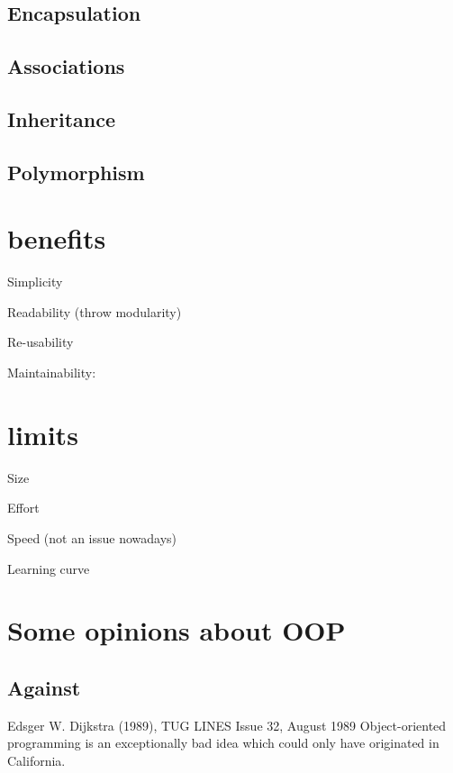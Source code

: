 \documentclass[12pt]{book}
\begin{document}
\subsection{Encapsulation}

\subsection{Associations}

\subsection{Inheritance}

\subsection{Polymorphism}


\section{benefits}


Simplicity

Readability (throw modularity)

Re-usability

Maintainability: 


\section{limits}

Size 

Effort

Speed (not an issue nowadays)

Learning curve


\section{Some opinions about OOP}

\subsection{Against}

\begin{kodequote}{Edsger W. Dijkstra (1989), TUG LINES Issue 32, August 1989}
	Object-oriented programming is an exceptionally bad idea which could only have originated in California.
\end{kodequote}
\end{document}
